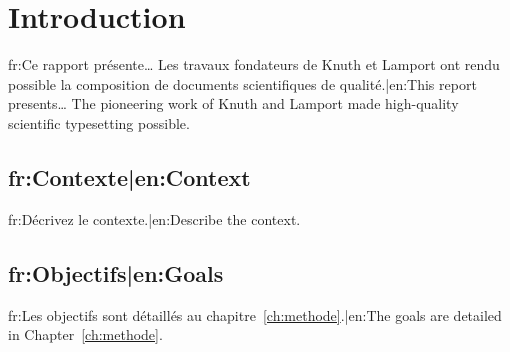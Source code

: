 \chapter{Introduction}
\label{ch:introduction}

{{fr:Ce rapport présente… Les travaux fondateurs de Knuth \cite{knuth1984} et Lamport \cite{lamport1994} ont rendu possible la composition de documents scientifiques de qualité.|en:This report presents… The pioneering work of Knuth \cite{knuth1984} and Lamport \cite{lamport1994} made high-quality scientific typesetting possible.}}

\section{{{fr:Contexte|en:Context}}}
{{fr:Décrivez le contexte.|en:Describe the context.}}

\section{{{fr:Objectifs|en:Goals}}}
{{fr:Les objectifs sont détaillés au chapitre~\ref{ch:methode}.|en:The goals are detailed in Chapter~\ref{ch:methode}.}}
